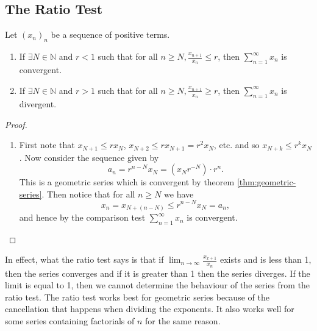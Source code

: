 \documentclass[../real_analysis.tex]{subfiles}
\begin{document}
        \subsection{The Ratio Test}\label{subsec:ratio-test}
            \begin{theorem}
                Let $(x_n)_n$ be a sequence of positive terms.
                \begin{enumerate}[label={\upshape(\roman*)}]
                    \item If $\exists N\in\mathbb{N}$ and $r<1$ such that for all $n\geq N, \frac{x_{n+1}}{x_n}\leq r$, then $\sum_{n=1}^\infty x_n$ is convergent.
                    \item If $\exists N\in\mathbb{N}$ and $r>1$ such that for all $n\geq N, \frac{x_{n+1}}{x_n}\geq r$, then $\sum_{n=1}^\infty x_n$ is divergent.
                    \end{enumerate}
            \end{theorem}
            \begin{proof}
                \begin{enumerate}[label={\upshape(\roman*)}]
                    \item First note that $x_{N+1}\leq rx_N$, $x_{N+2}\leq rx_{N+1}=r^2x_N$, etc. and so $x_{N+k}\leq r^kx_N$. Now consider the sequence given by
                    \begin{equation}
                        a_n=r^{n-N}x_N=(x_Nr^{-N})\cdot r^n.
                    \end{equation}
                    This is a geometric series which is convergent by theorem \ref{thm:geometric-series}. Then notice that for all $n\geq N$ we have
                    \begin{equation}
                        x_n=x_{N+(n-N)}\leq r^{n-N}x_N=a_n,
                    \end{equation}
                    and hence by the comparison test $\sum_{n=1}^\infty x_n$ is convergent.
                \end{enumerate}
            \end{proof}
            In effect, what the ratio test says is that if $\lim_{n\to\infty}\frac{x_{x+1}}{x_n}$ exists and is less than 1, then the series converges and if it is greater than 1 then the series diverges. If the limit is equal to 1, then we cannot determine the behaviour of the series from the ratio test. The ratio test works best for geometric series because of the cancellation that happens when dividing the exponents. It also works well for some series containing factorials of $n$ for the same reason.
\end{document}
